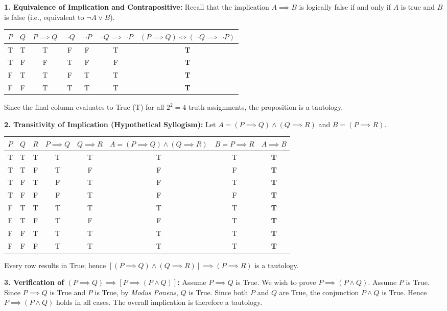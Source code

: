 \begin{solution}
\textbf{1. Equivalence of Implication and Contrapositive:}
Recall that the implication $A \implies B$ is logically false if and only if $A$ is true and $B$ is false (i.e., equivalent to $\neg A \lor B$).
\begin{center}
\begin{tabular}{cc|c|cc|c|c}
\toprule
$P$ & $Q$ & $P \implies Q$ & $\neg Q$ & $\neg P$ & $\neg Q \implies \neg P$ & $(P \implies Q) \iff (\neg Q \implies \neg P)$ \\
\midrule
T & T & T & F & F & T & \textbf{T} \\
T & F & F & T & F & F & \textbf{T} \\
F & T & T & F & T & T & \textbf{T} \\
F & F & T & T & T & T & \textbf{T} \\
\bottomrule
\end{tabular}
\end{center}
Since the final column evaluates to True (T) for all $2^2=4$ truth assignments, the proposition is a tautology.

\textbf{2. Transitivity of Implication (Hypothetical Syllogism):}
Let $A = (P \implies Q) \land (Q \implies R)$ and $B = (P \implies R)$.
\begin{center}
\small
\begin{tabular}{ccc|cc|c|c|c}
\toprule
$P$ & $Q$ & $R$ & $P \implies Q$ & $Q \implies R$ & $A = (P \implies Q)\land(Q \implies R)$ & $B = P \implies R$ & $A \implies B$ \\
\midrule
T & T & T & T & T & T & T & \textbf{T} \\
T & T & F & T & F & F & F & \textbf{T} \\
T & F & T & F & T & F & T & \textbf{T} \\
T & F & F & F & T & F & F & \textbf{T} \\
F & T & T & T & T & T & T & \textbf{T} \\
F & T & F & T & F & F & T & \textbf{T} \\
F & F & T & T & T & T & T & \textbf{T} \\
F & F & F & T & T & T & T & \textbf{T} \\
\bottomrule
\end{tabular}
\end{center}
Every row results in True; hence $[(P \implies Q) \land (Q \implies R)] \implies (P \implies R)$ is a tautology.

\textbf{3. Verification of $(P \implies Q) \implies [P \implies (P \land Q)]$:}
Assume $P \implies Q$ is True. We wish to prove $P \implies (P \land Q)$.
Assume $P$ is True. Since $P \implies Q$ is True and $P$ is True, by \emph{Modus Ponens}, $Q$ is True.
Since both $P$ and $Q$ are True, the conjunction $P \land Q$ is True.
Hence $P \implies (P \land Q)$ holds in all cases. The overall implication is therefore a tautology.
\end{solution}

